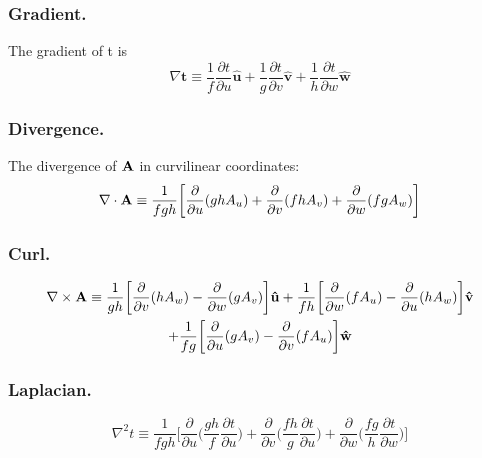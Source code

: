 \documentclass[../main.tex]{subfiles}
\begin{document}
\subsubsection*{Gradient.} The gradient of t is
\begin{equation*}
    \nabla \mathbf{t} \equiv \frac{1}{f}\frac{\partial t}{\partial u}\mathbf{\hat{u}}+ \frac{1}{g}\frac{\partial t}{\partial v}\mathbf{\hat{v}}+ \frac{1}{h}\frac{\partial t}{\partial w}\mathbf{\hat{w}}
\end{equation*}

\subsubsection*{Divergence.} The divergence of $\mathbf{A}$ in curvilinear coordinates:
\begin{equation*}
    \nabla \cdot \mathbf{A}\equiv \frac{1}{fgh} \biggl[ \frac{\partial}{\partial u} (ghA_u)+ \frac{\partial}{\partial v} (fh A_v)+\frac{\partial}{\partial w} (fg A_w)\biggr]
\end{equation*}

\subsubsection*{Curl.} 
\begin{multline*}
    \nabla \times \mathbf{A}\equiv \frac{1}{gh} \biggl[\frac{\partial}{\partial v} (hA_w) -\frac{\partial}{\partial w } (g A_{v}) \biggr]\mathbf{\hat{u}}
    +\frac{1}{fh} \biggl[\frac{\partial}{\partial w} (f A_{u}) -\frac{\partial}{\partial u } (h A_{w}) \biggr]\mathbf{\hat{v}}\\
    +\frac{1}{fg} \biggl[\frac{\partial}{\partial u} (g A_{v}) -\frac{\partial}{\partial v } (f A_{u}) \biggr]\mathbf{\hat{w}}
\end{multline*}

\subsubsection*{Laplacian.} 
\begin{equation*}
    \nabla^2t\equiv \frac{1}{fgh}\biggl[\frac{\partial}{\partial u}\Biggl(\frac{gh}{f}\frac{\partial t}{\partial u}\Biggr)+ \frac{\partial}{\partial v}\Biggl(\frac{fh}{g}\frac{\partial t}{\partial u} \Biggr)+ \frac{\partial}{\partial w}\Biggl(\frac{fg}{h}\frac{\partial t}{\partial w}\Biggr)\biggr]
\end{equation*}
\end{document}
